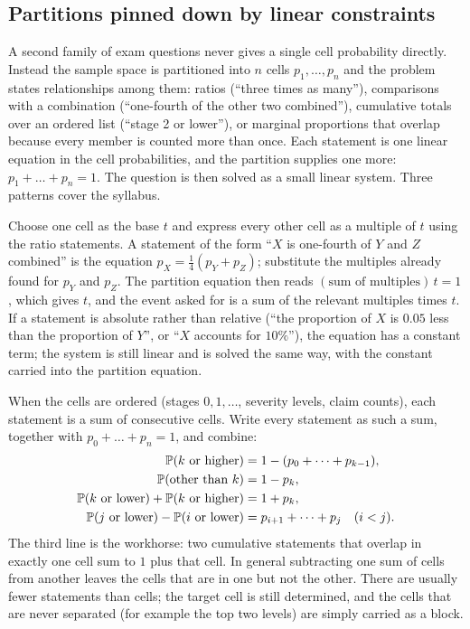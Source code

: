 \subsection{Partitions pinned down by linear constraints}

A second family of exam questions never gives a single cell probability directly. Instead
the sample space is partitioned into $n$ cells $p_1, \dots, p_n$ and the problem states
relationships among them: ratios (``three times as many''), comparisons with a combination
(``one-fourth of the other two combined''), cumulative totals over an ordered list
(``stage 2 or lower''), or marginal proportions that overlap because every member is
counted more than once. Each statement is one linear equation in the cell probabilities,
and the partition supplies one more: $p_1 + \dots + p_n = 1$. The question is then solved
as a small linear system. Three patterns cover the syllabus.

\begin{keyfact}
Choose one cell as the base $t$ and express every other cell as a multiple of $t$ using the
ratio statements. A statement of the form ``$X$ is one-fourth of $Y$ and $Z$ combined'' is
the equation $p_X = \tfrac14 (p_Y + p_Z)$; substitute the multiples already found for $p_Y$
and $p_Z$. The partition equation then reads $(\text{sum of multiples})\, t = 1$, which
gives $t$, and the event asked for is a sum of the relevant multiples times $t$. If a
statement is absolute rather than relative (``the proportion of $X$ is $0.05$ less than the
proportion of $Y$'', or ``$X$ accounts for $10\%$''), the equation has a constant term; the
system is still linear and is solved the same way, with the constant carried into the
partition equation.
\end{keyfact}

\begin{keyfact}
When the cells are ordered (stages $0, 1, \dots$, severity levels, claim counts), each
statement is a sum of consecutive cells. Write every statement as such a sum, together with
$p_0 + \dots + p_n = 1$, and combine:
\begin{align*}
\mathbb{P}(\text{$k$ or higher}) &= 1 - (p_0 + \dots + p_{k-1}), \\
\mathbb{P}(\text{other than } k) &= 1 - p_k, \\
\mathbb{P}(\text{$k$ or lower}) + \mathbb{P}(\text{$k$ or higher}) &= 1 + p_k, \\
\mathbb{P}(\text{$j$ or lower}) - \mathbb{P}(\text{$i$ or lower}) &= p_{i+1} + \dots + p_j \quad (i < j).
\end{align*}
The third line is the workhorse: two cumulative statements that overlap in exactly one cell
sum to $1$ plus that cell. In general subtracting one sum of cells from another leaves the
cells that are in one but not the other. There are usually fewer statements than cells; the
target cell is still determined, and the cells that are never separated (for example the
top two levels) are simply carried as a block.
\end{keyfact}

